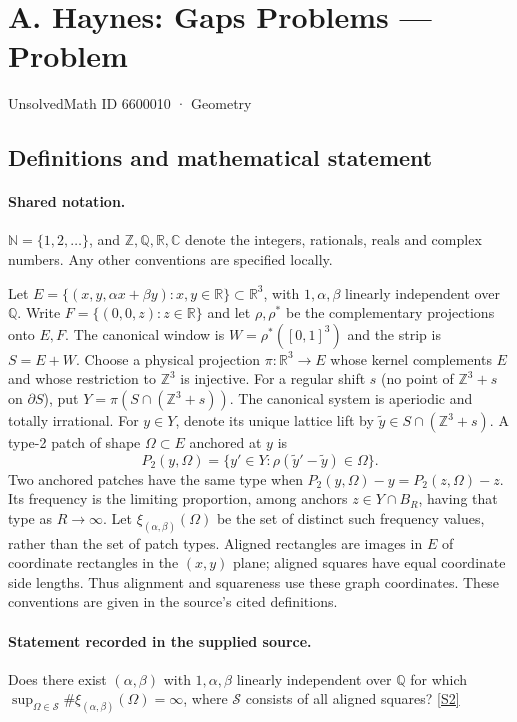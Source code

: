 \documentclass[11pt]{article}
\newcommand{\sref}[2]{\hyperlink{source:#1:#2}{[S#2]}}
\begin{document}
\setcounter{section}{6600009}
\section{A. Haynes: Gaps Problems — Problem}\label{6600010}
{\small\sffamily UnsolvedMath ID 6600010 · Geometry}
\subsection{Definitions and mathematical statement}

\paragraph{Shared notation.}$\mathbb N=\{1,2,\ldots\}$, and $\mathbb Z,\mathbb Q,\mathbb R,\mathbb C$ denote the integers, rationals, reals and complex numbers. Any other conventions are specified locally.


Let $E=\{(x,y,\alpha x+\beta y):x,y\in\mathbb R\}\subset\mathbb R^3$, with $1,\alpha,\beta$ linearly independent over $\mathbb Q$. Write $F=\{(0,0,z):z\in\mathbb R\}$ and let $\rho,\rho^*$ be the complementary projections onto $E,F$. The canonical window is $W=\rho^*([0,1]^3)$ and the strip is $S=E+W$. Choose a physical projection $\pi:\mathbb R^3\to E$ whose kernel complements $E$ and whose restriction to $\mathbb Z^3$ is injective. For a regular shift $s$ (no point of $\mathbb Z^3+s$ on $\partial S$), put $Y=\pi(S\cap(\mathbb Z^3+s))$. The canonical system is aperiodic and totally irrational. For $y\in Y$, denote its unique lattice lift by $\widetilde y\in S\cap(\mathbb Z^3+s)$. A type-2 patch of shape $\Omega\subset E$ anchored at $y$ is
\[P_2(y,\Omega)=\{y'\in Y:\rho(\widetilde y'-\widetilde y)\in\Omega\}.\]
Two anchored patches have the same type when $P_2(y,\Omega)-y=P_2(z,\Omega)-z$. Its frequency is the limiting proportion, among anchors $z\in Y\cap B_R$, having that type as $R\to\infty$. Let $\xi_{(\alpha,\beta)}(\Omega)$ be the set of distinct such frequency values, rather than the set of patch types. Aligned rectangles are images in $E$ of coordinate rectangles in the $(x,y)$ plane; aligned squares have equal coordinate side lengths. Thus alignment and squareness use these graph coordinates. These conventions are given in the source’s cited definitions.
\paragraph{Statement recorded in the supplied source.}
Does there exist $(\alpha,\beta)$ with $1,\alpha,\beta$ linearly independent over $\mathbb Q$ for which $\sup_{\Omega\in\mathcal S}\#\xi_{(\alpha,\beta)}(\Omega)=\infty$, where $\mathcal S$ consists of all aligned squares? \sref{6600010}{2}
\end{document}

